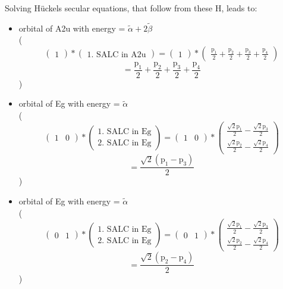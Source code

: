 \documentclass[12pt,a4paper]{article}
\begin{document}
Solving Hückels secular equations, that follow from these H, leads to:
\begin{itemize}
\item orbital of A2u with energy = 
                                $\tilde{\alpha} + 2 \tilde{\beta}$ \\
( 
$$
\begin{pmatrix}1\end{pmatrix} * \left(\begin{array}{c}\text{1. SALC in A2u}\end{array}\right) = \begin{pmatrix}1\end{pmatrix} * \begin{pmatrix}\frac{\text{p}_{1}}{2} + \frac{\text{p}_{2}}{2} + \frac{\text{p}_{3}}{2} + \frac{\text{p}_{4}}{2}\end{pmatrix} 
 $$ $$ = \frac{\text{p}_{1}}{2} + \frac{\text{p}_{2}}{2} + \frac{\text{p}_{3}}{2} + \frac{\text{p}_{4}}{2} 
 $$ 
 )

\item orbital of Eg with energy = 
                                $\tilde{\alpha}$ \\
( 
$$
\begin{pmatrix}1 & 0\end{pmatrix} * \left(\begin{array}{c}\text{1. SALC in Eg} \\ \text{2. SALC in Eg}\end{array}\right) = \begin{pmatrix}1 & 0\end{pmatrix} * \begin{pmatrix}\frac{\sqrt{2} \text{p}_{1}}{2} - \frac{\sqrt{2} \text{p}_{3}}{2}\\\frac{\sqrt{2} \text{p}_{2}}{2} - \frac{\sqrt{2} \text{p}_{4}}{2}\end{pmatrix} 
 $$ $$ = \frac{\sqrt{2} \left(\text{p}_{1} - \text{p}_{3}\right)}{2} 
 $$ 
 )

\item orbital of Eg with energy = 
                                $\tilde{\alpha}$ \\
( 
$$
\begin{pmatrix}0 & 1\end{pmatrix} * \left(\begin{array}{c}\text{1. SALC in Eg} \\ \text{2. SALC in Eg}\end{array}\right) = \begin{pmatrix}0 & 1\end{pmatrix} * \begin{pmatrix}\frac{\sqrt{2} \text{p}_{1}}{2} - \frac{\sqrt{2} \text{p}_{3}}{2}\\\frac{\sqrt{2} \text{p}_{2}}{2} - \frac{\sqrt{2} \text{p}_{4}}{2}\end{pmatrix} 
 $$ $$ = \frac{\sqrt{2} \left(\text{p}_{2} - \text{p}_{4}\right)}{2} 
 $$ 
 )


\end{itemize}
\end{document}
